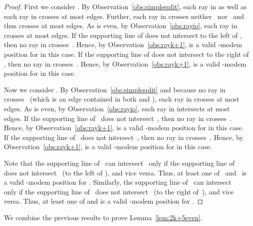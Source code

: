 \documentclass[A4]{article}
\begin{document}
\begin{proof}
First we consider .
By Observation~\ref{obs:simplesplit}, each ray in  as well as each ray in  crosses at most  edges.
Further, each ray in  crosses neither~ nor~ and thus crosses at most  edges.
As  is even, by Observation~\ref{obs:rayio}, each ray in  crosses at most  edges.
If the supporting line of  does not intersect  to the left of , then no ray in  crosses~.
Hence, by Observation~\ref{obs:rayk+1},  is a valid \mbox{-modem} position for  in this case.
If the supporting line of  does not intersect  to the right of , then no ray in  crosses~.
Hence, by Observation~\ref{obs:rayk+1},  is a valid \mbox{-modem} position for  in this case.


Now we consider .
By Observation~\ref{obs:simplesplit} and because no ray in  crosses~ (which is an edge contained in both  and ), each ray in  crosses at most  edges.
As  is even, by Observation~\ref{obs:rayio}, each ray in  intersects at most  edges.
If the supporting line of~ does not intersect~, then no ray in  crosses~.
Hence, by Observation~\ref{obs:rayk+1},  is a valid \mbox{-modem} position for  in this case.
If the supporting line of~ does not intersect~, then no ray in  crosses~.
Hence, by Observation~\ref{obs:rayk+1},  is a valid \mbox{-modem} position for  in this case.

Note that the supporting line of~ can intersect~ only if the supporting line of~ does not intersect~ (to the left of ), and vice versa.
Thus, at least one of~ and~ is a valid \mbox{-modem} position for .
Similarly, the supporting line of~ can intersect~ only if the supporting line of~ does not intersect~ (to the right of~), and vice versa.
Thus, at least one of  and  is a valid \mbox{-modem} position for .
\end{proof}

We combine the previous results to prove Lemma~\ref{lem:2k+5even}.
\end{document}
